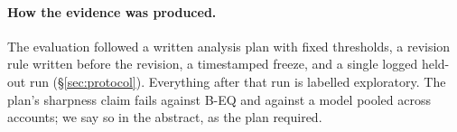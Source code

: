 \paragraph{How the evidence was produced.} The evaluation followed a
written analysis plan with fixed thresholds, a revision rule written before
the revision, a timestamped freeze, and a single logged held-out run
(\S\ref{sec:protocol}). Everything after that run is labelled
exploratory. The plan's sharpness claim fails against B-EQ and against a
model pooled across accounts; we say so in the abstract, as the plan
required.
